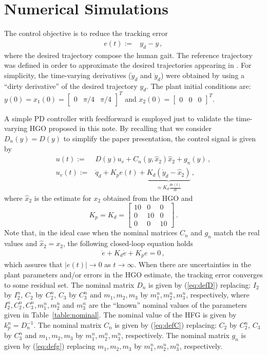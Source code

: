 \documentclass[letterpaper, 10 pt, conference]{ieeeconf}  %
\theoremstyle{plain}
\theoremstyle{definition}
\theoremstyle{remark}
\begin{document}
\section{Numerical Simulations}

The control objective is to reduce the tracking error 
%
\begin{align}
e(t) := & y_{d} - y\,,
\end{align}
%
where the desired trajectory compose the human gait.
%
The reference trajectory was defined in order to approximate the desired trajectories appearing  in \cite{Richter2015}. For simplicity, the time-varying derivatives ($\dot{y}_d$ and $\ddot{y}_d$) were obtained by using a ``dirty derivative'' of the   desired trajectory  $y_d$. The plant initial conditions are: $y(0)=x_1(0)=\left[\begin{array}{ccc} 0  & \pi/4 & \pi/4\end{array} \right ]^T$ and $x_2(0)=\left[\begin{array}{ccc} 0  & 0 & 0\end{array} \right ]^T$.


A simple PD controller with feedforward is employed just to validate the time-varying HGO proposed in this note. By recalling that we  consider $D_n(y)=D(y)$ to simplify the paper presentation, the control  signal is given by
%
\begin{align}
u(t) := & D(y) u_v + C_{n}(y,\hat{x}_2) \hat{x}_2+g_{n}(y)\,, \\
u_v(t):= &\ddot{q}_d + K_p e(t) + \underbrace{K_d (\dot{y}_d - \hat{x}_2)}_{\approx K_d \frac{de(t)}{dt}}\,,
\label{eq:defu}
\end{align}
%
where $\hat{x}_2$ is the estimate for $x_2$ obtained from the HGO and
%
$$K_p=K_d=\left[\begin{array}{ccc} 10   & 0 & 0\\ 0 & 10 & 0\\ 0 & 0 & 10\end{array} \right ]\,.$$
%
Note that, in the ideal case when the nominal matrices $C_n$ and $g_n$ match the real values and $\hat{x}_2=x_2$, the following closed-loop equation holds
%
\begin{align}
\ddot{e} + K_d \dot{e}+K_p e =0\,,
\label{eq:closed}
\end{align}
%
which assures that $|e(t)| \rightarrow 0$ as $t \rightarrow \infty$. When  there are uncertainties in the plant parameters and/or errors in the HGO estimate, the tracking error converges to some residual set.  The nominal matrix $D_n$ is given by (\ref{eq:defD}) replacing: $I_2$ by $I_2^n$,  $C_2$ by $C_2^n$, $C_3$ by $C_3^n$ and $m_1,m_2,m_3$ by $m_1^n, m_2^n, m_3^n$, respectively,  where  $I_2^n, C_2^n, C_3^n, m_1^n, m_2^n$ and $m_3^n$ are  the ``known'' nominal values of the parameters given in Table~\ref{table:nominal}. The nominal value of the HFG is given by $k_p^n=D_n^{-1}$. The nominal matrix $C_n$ is given by (\ref{eq:defC}) replacing: $C_2$ by $C_2^n$, $C_3$ by $C_3^n$ and $m_1,m_2,m_3$ by $m_1^n,m_2^n,m_3^n$, respectively. The nominal matrix $g_n$ is given by (\ref{eq:defg}) replacing  $m_1,m_2,m_3$ by $m_1^n, m_2^n, m_3^n$, respectively.  
\end{document}
